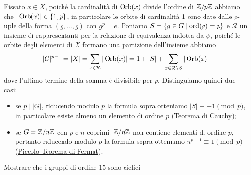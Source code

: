 \documentclass[11pt]{scrartcl}
\begin{document}
Fissato $x \in X$, poiché la cardinalità di $\operatorname{Orb}(x)$ divide l'ordine di ${\mathbb Z}/p{\mathbb Z}$
abbiamo che $|\operatorname{Orb}(x)| \in \{1, p\}$, in particolare le orbite di cardinalità
1 sono date dalle $p$-uple della forma $(g, \ldots, g)$ con $g^p = e$.
Poniamo $S = \{g\in G \mid \operatorname{ord}(g) = p\}$ e $\mathcal{R}$ un insieme di 
rappresentanti per la relazione di equivalenza indotta da $\psi$, poiché 
le orbite degli elementi di $X$ formano una partizione dell'insieme abbiamo
\[
    |G|^{p - 1} = |X| = \sum_{x \in \mathcal{R}} |\operatorname{Orb}(x)| = 1 + |S| + \sum_{x \in \mathcal{R}\setminus S}|\operatorname{Orb}(x)|
\]dove l'ultimo termine della somma è divisibile per $p$. Distinguiamo 
quindi due casi:
\begin{itemize}
    \item se $p\mid |G|$, riducendo modulo $p$ la formula sopra otteniamo
    $|S| \equiv -1 \pmod p$, in particolare esiste almeno un elemento di
    ordine $p$ (\hyperref[teorema1.0]{Teorema di Cauchy});
    \item se $G = {\mathbb Z}/n{\mathbb Z}$ con $p$ e $n$ coprimi, ${\mathbb Z}/n{\mathbb Z}$ non contiene elementi
    di ordine $p$, pertanto riducendo modulo $p$ la formula sopra otteniamo
    $n^{p - 1} \equiv 1 \pmod p$ (\hyperref[teorema2.0]{Piccolo Teorema di Fermat}).
\end{itemize}

\begin{exercise}
    Mostrare che i gruppi di ordine $15$ sono ciclici.
\end{exercise}
\end{document}

